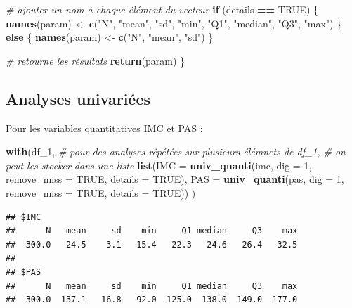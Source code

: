\documentclass[
]{book}
\newenvironment{Shaded}{\begin{snugshade}}{\end{snugshade}}
\newcommand{\AttributeTok}[1]{\textcolor[rgb]{0.13,0.29,0.53}{#1}}
\newcommand{\CommentTok}[1]{\textcolor[rgb]{0.56,0.35,0.01}{\textit{#1}}}
\newcommand{\ConstantTok}[1]{\textcolor[rgb]{0.56,0.35,0.01}{#1}}
\newcommand{\ControlFlowTok}[1]{\textcolor[rgb]{0.13,0.29,0.53}{\textbf{#1}}}
\newcommand{\DecValTok}[1]{\textcolor[rgb]{0.00,0.00,0.81}{#1}}
\newcommand{\FunctionTok}[1]{\textcolor[rgb]{0.13,0.29,0.53}{\textbf{#1}}}
\newcommand{\NormalTok}[1]{#1}
\newcommand{\OtherTok}[1]{\textcolor[rgb]{0.56,0.35,0.01}{#1}}
\newcommand{\SpecialCharTok}[1]{\textcolor[rgb]{0.81,0.36,0.00}{\textbf{#1}}}
\newcommand{\StringTok}[1]{\textcolor[rgb]{0.31,0.60,0.02}{#1}}
\begin{document}
\begin{Shaded}
\begin{Highlighting}[]
  \CommentTok{\# ajouter un nom à chaque élément du vecteur}
  \ControlFlowTok{if}\NormalTok{ (details }\SpecialCharTok{==} \ConstantTok{TRUE}\NormalTok{) \{}
    \FunctionTok{names}\NormalTok{(param) }\OtherTok{\textless{}{-}} \FunctionTok{c}\NormalTok{(}\StringTok{"N"}\NormalTok{, }\StringTok{"mean"}\NormalTok{, }\StringTok{"sd"}\NormalTok{, }\StringTok{"min"}\NormalTok{, }\StringTok{"Q1"}\NormalTok{, }\StringTok{"median"}\NormalTok{, }\StringTok{"Q3"}\NormalTok{, }\StringTok{"max"}\NormalTok{)}
\NormalTok{  \} }\ControlFlowTok{else}\NormalTok{ \{}
    \FunctionTok{names}\NormalTok{(param) }\OtherTok{\textless{}{-}} \FunctionTok{c}\NormalTok{(}\StringTok{"N"}\NormalTok{, }\StringTok{"mean"}\NormalTok{, }\StringTok{"sd"}\NormalTok{)}
\NormalTok{  \}}
  
  \CommentTok{\# retourne les résultats}
  \FunctionTok{return}\NormalTok{(param)}
\NormalTok{\}}
\end{Highlighting}
\end{Shaded}

\subsection{Analyses univariées}\label{analyses-univariuxe9es-1}

Pour les variables quantitatives IMC et PAS :

\begin{Shaded}
\begin{Highlighting}[]
\FunctionTok{with}\NormalTok{(df\_1,}
     \CommentTok{\# pour des analyses répétées sur plusieurs élémnets de df\_1,}
     \CommentTok{\# on peut les stocker dans une liste}
     \FunctionTok{list}\NormalTok{(}\AttributeTok{IMC =} \FunctionTok{univ\_quanti}\NormalTok{(imc, }\AttributeTok{dig =} \DecValTok{1}\NormalTok{, }\AttributeTok{remove\_miss =} \ConstantTok{TRUE}\NormalTok{, }\AttributeTok{details =} \ConstantTok{TRUE}\NormalTok{),}
          \AttributeTok{PAS =} \FunctionTok{univ\_quanti}\NormalTok{(pas, }\AttributeTok{dig =} \DecValTok{1}\NormalTok{, }\AttributeTok{remove\_miss =} \ConstantTok{TRUE}\NormalTok{, }\AttributeTok{details =} \ConstantTok{TRUE}\NormalTok{))}
\NormalTok{     )}
\end{Highlighting}
\end{Shaded}

\begin{verbatim}
## $IMC
##      N   mean     sd    min     Q1 median     Q3    max 
##  300.0   24.5    3.1   15.4   22.3   24.6   26.4   32.5 
## 
## $PAS
##      N   mean     sd    min     Q1 median     Q3    max 
##  300.0  137.1   16.8   92.0  125.0  138.0  149.0  177.0
\end{verbatim}
\end{document}
